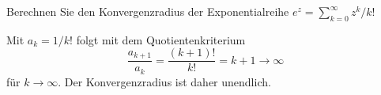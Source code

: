 Berechnen Sie den Konvergenzradius der Exponentialreihe
$e^z=\sum_{k=0}^\infty z^k/k!$

\begin{loesung}
Mit $a_k=1/k!$ folgt mit dem Quotientenkriterium
\[
\frac{a_{k+1}}{a_k}
=
\frac{(k+1)!}{k!}
=
k+1
\to
\infty
\]
für $k\to\infty$.
Der Konvergenzradius ist daher unendlich.
\end{loesung}
